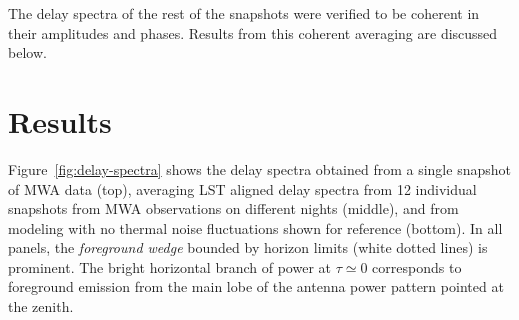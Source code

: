 \documentclass[preprint2,apjl,numberedappendix,twocolappendix,appendixfloats]{emulateapj}
\begin{document}
The delay spectra of the rest of the snapshots were verified to be coherent in their amplitudes and phases. Results from this coherent averaging are discussed below.

\section{Results}\label{sec:results}

Figure~\ref{fig:delay-spectra} shows the delay spectra obtained from a single snapshot of MWA data (top), averaging LST aligned delay spectra from 12 individual snapshots from MWA observations on different nights (middle), and from modeling with no thermal noise fluctuations shown for reference (bottom). In all panels, the {\it foreground wedge} bounded by horizon limits (white dotted lines) is prominent. The bright horizontal branch of power at $\tau\simeq 0$ corresponds to foreground emission from the main lobe of the antenna power pattern pointed at the zenith. 
\end{document}
